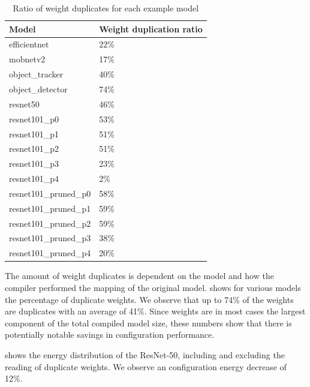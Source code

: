 \begin{table}[hbtp]
\centering
\begin{tabular}{@{}ll@{}}
\toprule
\textbf{Model}          & \textbf{Weight duplication ratio} \\ \midrule
efficientnet            & 22\%                              \\
mobnetv2                & 17\%                              \\
object\_tracker         & 40\%                              \\
object\_detector        & 74\%                              \\
resnet50                & 46\%                              \\
resnet101\_p0           & 53\%                              \\
resnet101\_p1           & 51\%                              \\
resnet101\_p2           & 51\%                              \\
resnet101\_p3           & 23\%                              \\
resnet101\_p4           & 2\%                               \\
resnet101\_pruned\_p0   & 58\%                              \\
resnet101\_pruned\_p1   & 59\%                              \\
resnet101\_pruned\_p2   & 59\%                              \\
resnet101\_pruned\_p3   & 38\%                              \\
resnet101\_pruned\_p4   & 20\%                              \\ \bottomrule
\end{tabular}
\caption{Ratio of weight duplicates for each example model}
\label{tab:example_models_duplicate_weights}
\end{table}

The amount of weight duplicates is dependent on the model and how the compiler performed the mapping of the original model.
 shows for various models the percentage of duplicate weights.
We observe that up to 74\% of the weights are duplicates with an average of 41\%.
Since weights are in most cases the largest component of the total compiled model size, these numbers show that there is potentially notable savings in configuration performance.

 shows the energy distribution of the ResNet-50, including and excluding the reading of duplicate weights. 
We observe an configuration energy decrease of 12\%.

